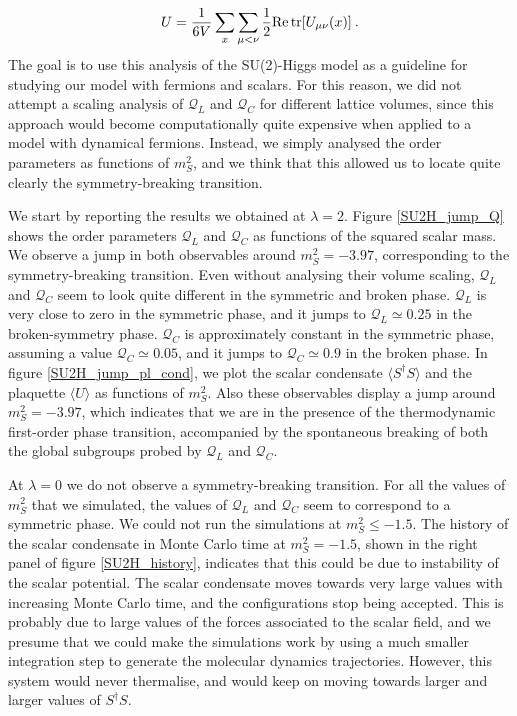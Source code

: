 \begin{equation}
U =  \frac{1}{6V} \sum_x \sum_{\mu < \nu} \frac{1}{2} \mathrm{Re} \tr[U_{\mu\nu}(x)] \: .
\end{equation}
%
The goal is to use this analysis of the SU(2)-Higgs model as a guideline for studying our model with fermions and scalars. For this reason, we did not attempt a scaling analysis of $\mathcal Q_L$ and $\mathcal Q_C$ for different lattice volumes, since this approach would become computationally quite expensive when applied to a model with dynamical fermions. Instead, we simply analysed the order parameters as functions of $m_S^2$, and we think that this allowed us to locate quite clearly the symmetry-breaking transition.

We start by reporting the results we obtained at $\lambda = 2$. Figure \ref{SU2H_jump_Q} shows the order parameters $\mathcal Q_L$ and $\mathcal Q_C$ as functions of the squared scalar mass. We observe a jump in both observables around $m_S^2 = -3.97$, corresponding to the symmetry-breaking transition. Even without analysing their volume scaling, $\mathcal Q_L$ and $\mathcal Q_C$ seem to look quite different in the symmetric and broken phase. $\mathcal Q_L$ is very close to zero in the symmetric phase, and  it jumps to $\mathcal Q_L \simeq 0.25$ in the broken-symmetry phase. $\mathcal Q_C$ is approximately constant in the symmetric phase, assuming a value $\mathcal Q_C \simeq 0.05$, and it jumps to $\mathcal Q_C \simeq 0.9$ in the broken phase. In figure \ref{SU2H_jump_pl_cond}, we plot the scalar condensate $\langle S^{\dagger}S \rangle$ and the plaquette $\langle U \rangle$ as functions of $m_S^2$. Also these observables display a jump around $m_S^2 = -3.97$, which indicates that we are in the presence of the thermodynamic first-order phase transition, accompanied by the spontaneous breaking of both the global subgroups probed by $\mathcal Q_L$ and $\mathcal Q_C$.

At $\lambda = 0$ we do not observe a symmetry-breaking transition. For all the values of $m_S^2$ that we simulated, the values of $\mathcal Q_L$ and $\mathcal Q_C$ seem to correspond to a symmetric phase. We could not run the simulations at $m_S^2 \leq -1.5$. The history of the scalar condensate in Monte Carlo time at $m_S^2 = -1.5$, shown in the right panel of figure \ref{SU2H_history}, indicates that this could be due to instability of the scalar potential. The scalar condensate moves towards very large values with increasing Monte Carlo time, and the configurations stop being accepted. This is probably due to large values of the forces associated to the scalar field, and we presume that we could make the simulations work by using a much smaller integration step to generate the molecular dynamics trajectories. However, this system would never thermalise, and would keep on moving towards larger and larger values of $S^{\dagger} S$.


